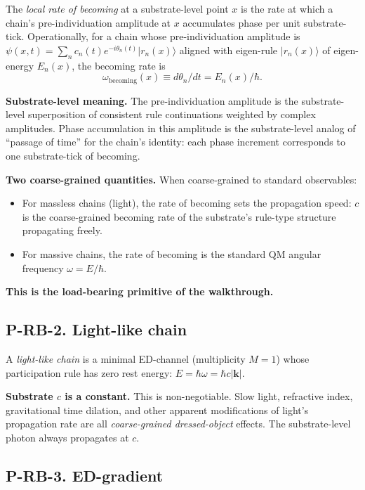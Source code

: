 \documentclass[11pt,a4paper]{article}
\begin{document}
The \emph{local rate of becoming} at a substrate-level point $x$ is the rate at which a chain's pre-individuation amplitude at $x$ accumulates phase per unit substrate-tick. Operationally, for a chain whose pre-individuation amplitude is $\psi(x, t) = \sum_n c_n(t) e^{-i\theta_n(t)}|r_n(x)\rangle$ aligned with eigen-rule $|r_n(x)\rangle$ of eigen-energy $E_n(x)$, the becoming rate is
\[
\omega_{\mathrm{becoming}}(x) \equiv d\theta_n/dt = E_n(x)/\hbar.
\]

\textbf{Substrate-level meaning.} The pre-individuation amplitude is the substrate-level superposition of consistent rule continuations weighted by complex amplitudes. Phase accumulation in this amplitude is the substrate-level analog of ``passage of time'' for the chain's identity: each phase increment corresponds to one substrate-tick of becoming.

\textbf{Two coarse-grained quantities.} When coarse-grained to standard observables:
\begin{itemize}[noitemsep]
  \item For massless chains (light), the rate of becoming sets the propagation speed: $c$ is the coarse-grained becoming rate of the substrate's rule-type structure propagating freely.
  \item For massive chains, the rate of becoming is the standard QM angular frequency $\omega = E/\hbar$.
\end{itemize}

\textbf{This is the load-bearing primitive of the walkthrough.}

\subsection{P-RB-2. Light-like chain}

A \emph{light-like chain} is a minimal ED-channel (multiplicity $M = 1$) whose participation rule has zero rest energy: $E = \hbar\omega = \hbar c|\mathbf{k}|$.

\textbf{Substrate $c$ is a constant.} This is non-negotiable. Slow light, refractive index, gravitational time dilation, and other apparent modifications of light's propagation rate are all \emph{coarse-grained dressed-object} effects. The substrate-level photon always propagates at $c$.

\subsection{P-RB-3. ED-gradient}
\end{document}
